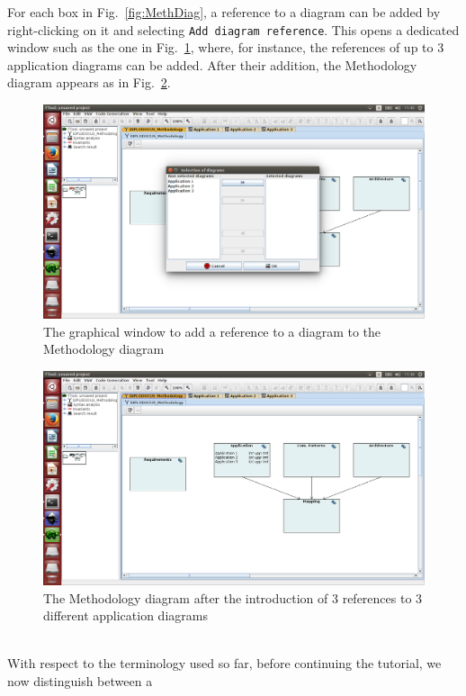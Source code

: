 \documentclass{llncs}
\newcommand{\screenshotsize}{1.0\textwidth}
\begin{document}
%
For each box in Fig.~\ref{fig:MethDiag}, a reference to a diagram can be added by right-clicking on it and selecting
\texttt{Add diagram reference}. This opens a dedicated window such as the one in Fig.~\ref{fig:AddDiagRef}, where, for
instance, the references of up to 3 application diagrams can be added. After their addition, the Methodology diagram
appears as in Fig.~\ref{fig:RefDiagAdded}.
%
\begin{figure}[htbp]
	\centering
	\includegraphics[width=\screenshotsize]{./figures/screenshot/AddRefDiag.png}
	\caption{The graphical window to add a reference to a diagram to the Methodology diagram}
	\label{fig:AddDiagRef}
\end{figure}
%
\begin{figure}[htbp]
	\centering
	\includegraphics[width=1.0\textwidth]{./figures/screenshot/RefDiagAdded.png}
	\caption{The Methodology diagram after the introduction of 3 references to 3 different application diagrams}
	\label{fig:RefDiagAdded}
\end{figure}
%
\\With respect to the terminology used so far, before continuing the tutorial, we now distinguish between a
\end{document}
